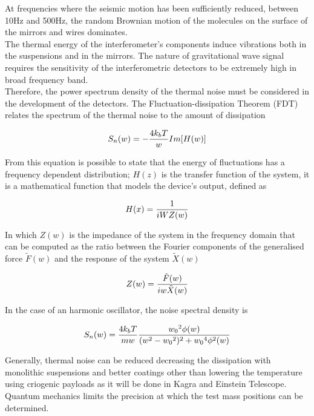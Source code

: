 \documentclass[binding=0.6cm, LaM]{sapthesis}
\begin{document}
        At frequencies where the seismic motion has been sufficiently reduced,
        between 10Hz and 500Hz, the random Brownian motion of the molecules on the surface of the mirrors and wires dominates. \\
    
        The thermal energy of the interferometer’s components induce vibrations both in the suspensions and in the mirrors.
        The nature of gravitational wave signal requires the sensitivity of the interferometric detectors
        to be extremely high in broad frequency band. \\
        Therefore, the power spectrum density of the thermal noise must be considered in the development of the detectors.
        The Fluctuation-dissipation Theorem (FDT) relates the spectrum of the thermal noise to the amount of dissipation

                \begin{equation}
                S_{n}(w) = - {{4k_bT} \over {w}} Im[H(w)]
                \end{equation}

        From this equation is possible to state that the energy of fluctuations has a frequency dependent distribution;
        $H(z)$ is the transfer function of the system, it is a mathematical function that models the device’s output, defined as

                \begin{equation}
                H(x) = {1 \over {iWZ(w)}}
                \end{equation}

        In which $Z(w)$ is the impedance of the system in the frequency domain that can be computed as the ratio
        between the Fourier components of the generalised force $\tilde F(w)$ and the response of the system $\tilde X(w)$

                \begin{equation}
                Z(w) = {{\tilde F(w)} \over {iw \tilde X(w)}}
                \end{equation}

        In the case of an harmonic oscillator, the noise spectral density is

                \begin{equation}
                S_n(w) = {{4k_bT} \over {mw}} {{{w_0}^2 \phi(w)} \over {(w^2-{w_0}^2)^2 + {w_0}^4 \phi^2(w)}}
		\end{equation} 

	Generally, thermal noise can be reduced decreasing the dissipation with monolithic suspensions and better coatings
        other than lowering the temperature using criogenic payloads as it will be done in Kagra and Einstein Telescope. \\
        Quantum mechanics limits the precision at which the test mass positions can be determined. 
\end{document}
